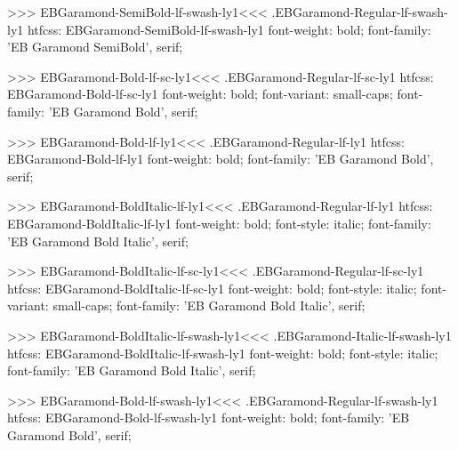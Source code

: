 {{>>>
\<EBGaramond-SemiBold-lf-swash-ly1\><<<
.EBGaramond-Regular-lf-swash-ly1
htfcss:  EBGaramond-SemiBold-lf-swash-ly1  font-weight: bold; font-family: 'EB Garamond SemiBold', serif;

>>>
\<EBGaramond-Bold-lf-sc-ly1\><<<
.EBGaramond-Regular-lf-sc-ly1
htfcss:  EBGaramond-Bold-lf-sc-ly1  font-weight: bold; font-variant: small-caps; font-family: 'EB Garamond Bold', serif;

>>>
\<EBGaramond-Bold-lf-ly1\><<<
.EBGaramond-Regular-lf-ly1
htfcss:  EBGaramond-Bold-lf-ly1  font-weight: bold; font-family: 'EB Garamond Bold', serif;

>>>
\<EBGaramond-BoldItalic-lf-ly1\><<<
.EBGaramond-Regular-lf-ly1
htfcss:  EBGaramond-BoldItalic-lf-ly1  font-weight: bold; font-style: italic; font-family: 'EB Garamond Bold Italic', serif;

>>>
\<EBGaramond-BoldItalic-lf-sc-ly1\><<<
.EBGaramond-Regular-lf-sc-ly1
htfcss:  EBGaramond-BoldItalic-lf-sc-ly1  font-weight: bold; font-style: italic; font-variant: small-caps; font-family: 'EB Garamond Bold Italic', serif;

>>>
\<EBGaramond-BoldItalic-lf-swash-ly1\><<<
.EBGaramond-Italic-lf-swash-ly1
htfcss:  EBGaramond-BoldItalic-lf-swash-ly1  font-weight: bold; font-style: italic; font-family: 'EB Garamond Bold Italic', serif;

>>>
\<EBGaramond-Bold-lf-swash-ly1\><<<
.EBGaramond-Regular-lf-swash-ly1
htfcss:  EBGaramond-Bold-lf-swash-ly1  font-weight: bold; font-family: 'EB Garamond Bold', serif;

}}
